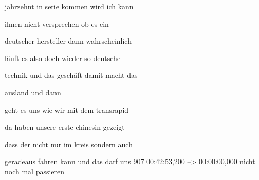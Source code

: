 \documentclass[a4paper, 11pt]{book} %
\begin{document}
jahrzehnt in serie kommen wird ich kann

ihnen nicht versprechen ob es ein

deutscher hersteller dann wahrscheinlich

läuft es also doch wieder so deutsche

technik und das geschäft damit macht das

ausland und dann

geht es uns wie wir mit dem transrapid

da haben unsere erste chinesin gezeigt

dass der nicht nur im kreis sondern auch

geradeaus fahren kann und das darf uns
907
00:42:53,200 --> 00:00:00,000
nicht noch mal passieren
\end{document}
